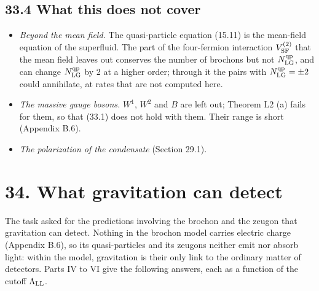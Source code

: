 \documentclass[
  10pt,
]{article}
\providecommand{\tightlist}{%
  \setlength{\itemsep}{0pt}\setlength{\parskip}{0pt}}
\begin{document}
\hypertarget{what-this-does-not-cover}{%
\subsection{33.4 What this does not
cover}\label{what-this-does-not-cover}}

\begin{itemize}
\tightlist
\item
  \emph{Beyond the mean field.} The quasi-particle equation (15.11) is
  the mean-field equation of the superfluid. The part of the
  four-fermion interaction \(V^{(2)}_{\rm SF}\) that the mean field
  leaves out conserves the number of brochons but not
  \(N^{\rm qp}_{\rm LG}\), and can change \(N^{\rm qp}_{\rm LG}\) by 2
  at a higher order; through it the pairs with
  \(N^{\rm qp}_{\rm LG}=\pm2\) could annihilate, at rates that are not
  computed here.
\item
  \emph{The massive gauge bosons.} \(W^1\), \(W^2\) and \(B\) are left
  out; Theorem L2 (a) fails for them, so that (33.1) does not hold with
  them. Their range is short (Appendix B.6).
\item
  \emph{The polarization of the condensate} (Section 29.1).
\end{itemize}

\hypertarget{what-gravitation-can-detect}{%
\section{34. What gravitation can
detect}\label{what-gravitation-can-detect}}

The task asked for the predictions involving the brochon and the zeugon
that gravitation can detect. Nothing in the brochon model carries
electric charge (Appendix B.6), so its quasi-particles and its zeugons
neither emit nor absorb light: within the model, gravitation is their
only link to the ordinary matter of detectors. Parts IV to VI give the
following answers, each as a function of the cutoff
\(\Lambda_{\rm LL}\).
\end{document}
